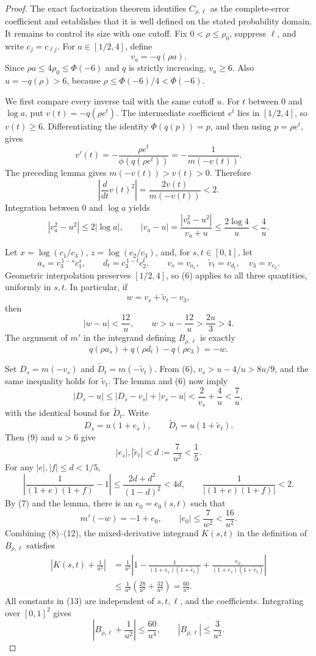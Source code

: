 \documentclass{article}
\begin{document}
\begin{proof}
The exact factorization theorem identifies \(C_{\rho,\ell}\) as the complete-error coefficient and establishes that it is well defined on the stated probability domain.  It remains to control its size with one cutoff.  Fix \(0<\rho\le\rho_0\), suppress \(\ell\), and write \(c_j=c_{\ell j}\).  For \(a\in[1/2,4]\), define
\[
v_a=-q(\rho a).
\]
Since \(\rho a\le4\rho_0\le\Phi(-6)\) and \(q\) is strictly increasing, \(v_a\ge6\).  Also \(u=-q(\rho)>6\), because \(\rho\le\Phi(-6)/4<\Phi(-6)\).

We first compare every inverse tail with the same cutoff \(u\).  For \(t\) between \(0\) and \(\log a\), put \(v(t)=-q(\rho e^t)\).  The intermediate coefficient \(e^t\) lies in \([1/2,4]\), so \(v(t)\ge6\).  Differentiating the identity \(\Phi(q(p))=p\), and then using \(p=\rho e^t\), gives
\[
v'(t)=-\frac{\rho e^t}{\phi(q(\rho e^t))}
=-\frac1{m(-v(t))}.
\tag{5}
\]
The preceding lemma gives \(m(-v(t))>v(t)>0\).  Therefore
\[
\left|\frac{d}{dt}v(t)^2\right|
=\frac{2v(t)}{m(-v(t))}<2.
\]
Integration between \(0\) and \(\log a\) yields
\[
|v_a^2-u^2|\le2|\log a|,
\qquad
|v_a-u|
=\frac{|v_a^2-u^2|}{v_a+u}
\le\frac{2\log4}{u}<\frac4u.
\tag{6}
\]

Let \(x=\log(c_1/c_3)\), \(z=\log(c_2/c_3)\), and, for \(s,t\in[0,1]\), let
\[
a_s=c_3^{\,1-s}c_1^s,
\qquad
d_t=c_3^{\,1-t}c_2^t,
\qquad
v_s=v_{a_s},\quad \widetilde v_t=v_{d_t},\quad v_3=v_{c_3}.
\]
Geometric interpolation preserves \([1/2,4]\), so (6) applies to all three quantities, uniformly in \(s,t\).  In particular, if
\[
w=v_s+\widetilde v_t-v_3,
\]
then
\[
|w-u|<\frac{12}{u},
\qquad
w>u-\frac{12}{u}>\frac{2u}{3}>4.
\tag{7}
\]
The argument of \(m'\) in the integrand defining \(B_{\rho,\ell}\) is exactly
\[
q(\rho a_s)+q(\rho d_t)-q(\rho c_3)=-w.
\tag{8}
\]

Set \(D_s=m(-v_s)\) and \(\widetilde D_t=m(-\widetilde v_t)\).  From (6), \(v_s>u-4/u>8u/9\), and the same inequality holds for \(\widetilde v_t\).  The lemma and (6) now imply
\[
|D_s-u|
\le |D_s-v_s|+|v_s-u|
<\frac2{v_s}+\frac4u
<\frac7u,
\tag{9}
\]
with the identical bound for \(\widetilde D_t\).  Write
\[
D_s=u(1+e_s),\qquad \widetilde D_t=u(1+\widetilde e_t).
\]
Then (9) and \(u>6\) give
\[
|e_s|,|\widetilde e_t|<d:=\frac7{u^2}<\frac15.
\tag{10}
\]
For any \(|e|,|f|\le d<1/5\),
\[
\left|\frac1{(1+e)(1+f)}-1\right|
\le\frac{2d+d^2}{(1-d)^2}<4d,
\qquad
\frac1{|(1+e)(1+f)|}<2.
\tag{11}
\]
By (7) and the lemma, there is an \(e_0=e_0(s,t)\) such that
\[
m'(-w)=-1+e_0,
\qquad
|e_0|\le\frac7{w^2}<\frac{16}{u^2}.
\tag{12}
\]
Combining (8)--(12), the mixed-derivative integrand \(K(s,t)\) in the definition of \(B_{\rho,\ell}\) satisfies
\[
\begin{aligned}
\left|K(s,t)+\frac1{u^2}\right|
&=\frac1{u^2}
\left|1-\frac1{(1+e_s)(1+\widetilde e_t)}
+\frac{e_0}{(1+e_s)(1+\widetilde e_t)}\right|\\
&\le\frac1{u^2}\left(\frac{28}{u^2}+\frac{32}{u^2}\right)
=\frac{60}{u^4}.
\end{aligned}
\tag{13}
\]
All constants in (13) are independent of \(s,t,\ell\), and the coefficients.  Integrating over \([0,1]^2\) gives
\[
\left|B_{\rho,\ell}+\frac1{u^2}\right|\le\frac{60}{u^4},
\qquad
|B_{\rho,\ell}|\le\frac3{u^2}.
\tag{14}
\]


\end{proof}
\end{document}

